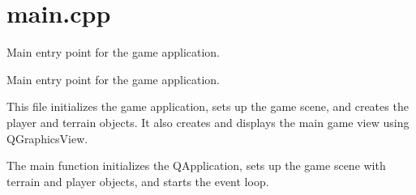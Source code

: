\chapter{main.\+cpp}
\hypertarget{index}{}\label{index}
Main entry point for the game application.

Main entry point for the game application.  

This file initializes the game application, sets up the game scene, and creates the player and terrain objects. It also creates and displays the main game view using {\ttfamily QGraphics\+View}.

The main function initializes the QApplication, sets up the game scene with terrain and player objects, and starts the event loop. 